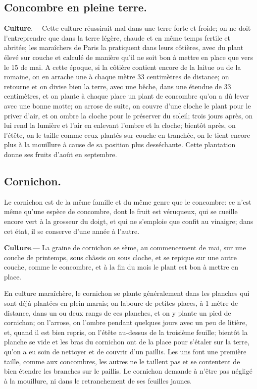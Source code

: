 \documentclass[10pt,a4paper]{book}
\begin{document}
\subsection{Concombre en pleine terre.}

\textbf{Culture}.--- Cette culture réussirait mal dans une terre forte et froide; on ne doit l'entreprendre que dans la terre légère, chaude et en même temps fertile et abritée; les maraîchers de Paris la pratiquent dans leurs côtières, avec du plant élevé sur couche et calculé de manière qu'il ne soit bon à mettre en place que vers le 15 de mai. A cette époque, si la côtière contient encore de la laitue ou de la romaine, on en arrache une à chaque mètre 33 centimètres de distance; on retourne et on divise bien la terre, avec une bêche, dans une étendue de 33 centimètres, et on plante à chaque place un plant de concombre qu'on a dû lever avec une bonne motte; on arrose de suite, on couvre d'une cloche le plant pour le priver d'air, et on ombre la cloche pour le préserver du soleil; trois jours après, on lui rend la lumière et l'air en enlevant l'ombre et la cloche; bientôt après, on l'étête, on le taille comme ceux plantés sur couche en tranchée, on le tient encore plus à la mouillure à cause de sa position plus desséchante. Cette plantation donne ses fruits d'août en septembre.

\subsection{Cornichon.}

Le cornichon est de la même famille et du même genre que le concombre: ce n'est même qu'une espèce de concombre, dont le fruit est véruqueux, qui se cueille encore vert à la grosseur du doigt, et qui ne s'emploie que confit au vinaigre; dans cet état, il se conserve d'une année à l'autre.

\textbf{Culture}.--- La graine de cornichon se sème, au commencement de mai, sur une couche de printemps, sous châssis ou sous cloche, et se repique sur une autre couche, comme le concombre, et à la fin du mois le plant est bon à mettre en place.

En culture maraîchère, le cornichon se plante généralement dans les planches qui sont déjà plantées en plein marais; on laboure de petites places, à 1 mètre de distance, dans un ou deux rangs de ces planches, et on y plante un pied de cornichon; on l'arrose, on l'ombre pendant quelques jours avec un peu de litière, et, quand il est bien repris, on l'étête au-dessus de la troisième feuille; bientôt la planche se vide et les bras du cornichon ont de la place pour s'étaler sur la terre, qu'on a eu soin de nettoyer et de couvrir d'un paillis. Les uns font une première taille, comme aux concombres, les autres ne le taillent pas et se contentent de bien étendre les branches sur le paillis. Le cornichon demande à n'être pas négligé à la mouillure, ni dans le retranchement de ses feuilles jaunes.
\end{document}
